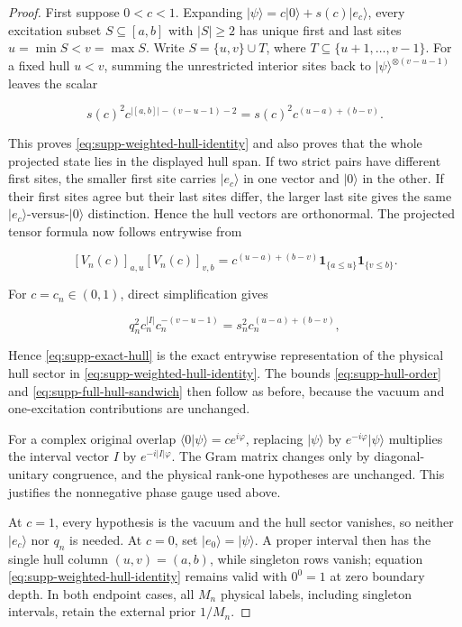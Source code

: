 \begin{proof}
First suppose \(0<c<1\).  Expanding
\(|\psi\rangle=c|0\rangle+s(c)|e_c\rangle\), every excitation subset
\(S\subseteq[a,b]\) with \(|S|\ge2\) has unique first and last sites
\(u=\min S<v=\max S\).  Write
\(S=\{u,v\}\cup T\), where
\(T\subseteq\{u+1,\ldots,v-1\}\).  For a fixed hull \(u<v\), summing the
unrestricted interior sites back to
\(|\psi\rangle^{\otimes(v-u-1)}\) leaves the scalar

\[
 s(c)^2c^{|[a,b]|-(v-u-1)-2}
 =s(c)^2c^{(u-a)+(b-v)}.
\]

This proves \eqref{eq:supp-weighted-hull-identity} and also proves that the
whole projected state lies in the displayed hull span.  If two strict pairs
have different first sites, the smaller first site carries \(|e_c\rangle\)
in one vector and \(|0\rangle\) in the other.  If their first sites agree
but their last sites differ, the larger last site gives the same
\(|e_c\rangle\)-versus-\(|0\rangle\) distinction.  Hence the hull vectors
are orthonormal.  The projected tensor formula now follows entrywise from

\[
 [V_n(c)]_{a,u}[V_n(c)]_{v,b}
 =c^{(u-a)+(b-v)}
  \mathbf1_{\{a\le u\}}\mathbf1_{\{v\le b\}}.
\]

For \(c=c_n\in(0,1)\), direct simplification gives

\[
 q_n^2c_n^{|I|}c_n^{-(v-u-1)}
 =s_n^2c_n^{(u-a)+(b-v)},
\]

Hence \eqref{eq:supp-exact-hull} is the exact entrywise representation of the
physical hull sector in \eqref{eq:supp-weighted-hull-identity}.
The bounds \eqref{eq:supp-hull-order} and
\eqref{eq:supp-full-hull-sandwich} then follow as before, because the
vacuum and one-excitation contributions are unchanged.

For a complex original overlap
\(\langle0|\psi\rangle=ce^{i\varphi}\), replacing
\(|\psi\rangle\) by \(e^{-i\varphi}|\psi\rangle\) multiplies the interval
vector \(I\) by \(e^{-i|I|\varphi}\).  The Gram matrix changes only by
diagonal-unitary congruence, and the physical rank-one hypotheses are
unchanged.  This justifies the nonnegative phase gauge used above.

At \(c=1\), every hypothesis is the vacuum and the hull sector vanishes, so
neither \(|e_c\rangle\) nor \(q_n\) is needed. At \(c=0\), set
\(|e_0\rangle=|\psi\rangle\). A proper interval then has the single hull column
\((u,v)=(a,b)\), while singleton rows vanish; equation
\eqref{eq:supp-weighted-hull-identity} remains valid with \(0^0=1\) at zero
boundary depth. In both endpoint cases, all \(M_n\) physical labels, including
singleton intervals, retain the external prior \(1/M_n\).
\end{proof}

